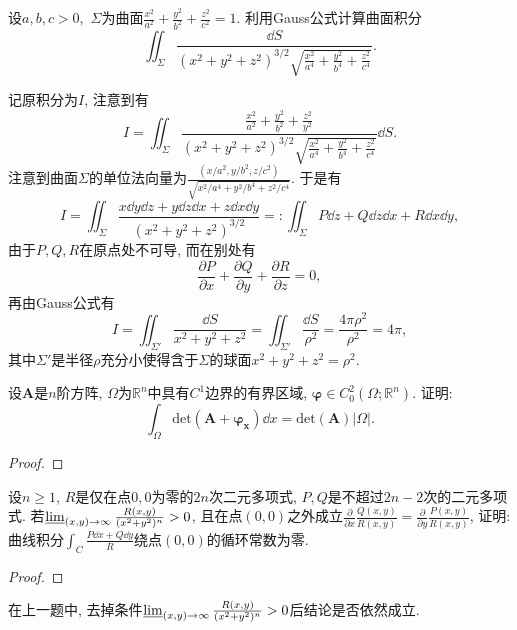 \begin{quizb}
\woe 设\(a,b,c>0,\) \(\varSigma\)为曲面\(\frac{x^2}{a^2}+\frac{y^2}{b^2}+\frac{z^2}{c^2}=1.\) 利用Gauss公式计算曲面积分\[\iint_{\varSigma}\frac{\dd S}{(x^2+y^2+z^2)^{3/2}\sqrt{\displaystyle\frac{x^2}{a^4}+\frac{y^2}{b^4}+\frac{z^2}{c^4}}}.\]
\begin{solution}
记原积分为\(I\), 注意到有\[I=\iint_{\varSigma}\frac{\displaystyle\frac{x^2}{a^2}+\frac{y^2}{b^2}+\frac{z^2}{y^2}}{(x^2+y^2+z^2)^{3/2}\sqrt{\displaystyle\frac{x^2}{a^4}+\frac{y^2}{b^4}+\frac{z^2}{c^4}}}\dd S.\]
注意到曲面\(\varSigma\)的单位法向量为\(\frac{\left(x/a^2,y/b^2,z/c^2\right)}{\sqrt{x^2/a^4+y^2/b^4+z^2/c^4}}\). 于是有\[I=\iint_{\varSigma}\frac{x\dd y\dd z+y\dd z\dd x+z\dd x\dd y}{\left(x^2+y^2+z^2\right)^{3/2}}=:\iint_{\varSigma}P \dd z+Q\dd z\dd x+R\dd x\dd y,\]由于\(P,Q,R\)在原点处不可导, 而在别处有\[\frac{\partial P}{\partial x}+\frac{\partial Q}{\partial y}+\frac{\partial R}{\partial z}=0,\]再由Gauss公式有\[I=\iint_{\varSigma'}\frac{\dd S}{x^2+y^2+z^2}=\iint_{\varSigma'}\frac{\dd S}{\rho^2}=\frac{4\pi\rho^2}{\rho^2}=4\pi,\]其中\(\varSigma'\)是半径\(\rho\)充分小使得含于\(\varSigma\)的球面\(x^2+y^2+z^2=\rho^2\).
\end{solution}
\woe 设\(\boldsymbol{A}\)是\(n\)阶方阵, \(\varOmega\)为\(\mathbb{R}^n\)中具有\(C^1\)边界的有界区域, \(\boldsymbol{\varphi}\in C^2_0(\varOmega;\mathbb{R}^n)\). 证明: \[\int_{\varOmega}\mathrm{det}\left(\boldsymbol{A}+\boldsymbol{\varphi_x}\right)\dd x=\mathrm{det}(\boldsymbol{A})\left|\varOmega\right|.\]
\begin{proof}

\end{proof}
\woe 设\(n\geqslant 1\), \(R\)是仅在点\(0,0\)为零的\(2n\)次二元多项式, \(P,Q\)是不超过\(2n-2\)次的二元多项式. 若\(\varliminf_{(x,y)\rightarrow\infty}\frac{R(x,y)}{(x^2+y^2)^n}>0\), 且在点\((0,0)\)之外成立\(\frac{\partial}{\partial x}\frac{Q(x,y)}{R(x,y)}=\frac{\partial}{\partial y}\frac{P(x,y)}{R(x,y)}\), 证明: 曲线积分\(\int_{C}\frac{P\dd x+Q\dd y}{R}\)绕点\((0,0)\)的循环常数为零.
\begin{proof}

\end{proof}
\woe 在上一题中, 去掉条件\(\varliminf_{(x,y)\rightarrow\infty}\frac{R(x,y)}{(x^2+y^2)^n}>0\)后结论是否依然成立.
\begin{solution}

\end{solution}
\end{quizb}
